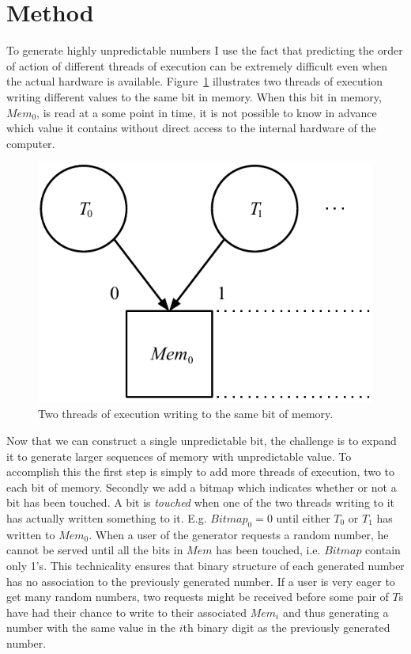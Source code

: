 \section{Method}
\label{sec:method}
To generate highly unpredictable numbers I use the fact that predicting the order of action of different threads of execution can be extremely difficult even when the actual hardware is available.
Figure~\ref{fig:TrueRand} illustrates two threads of execution writing different values to the same bit in memory.
When this bit in memory, $Mem_0$, is read at a some point in time, it is not possible to know in advance which value it contains without direct access to the internal hardware of the computer.

\begin{figure}
	\centering
		\includegraphics[width=0.5\columnwidth]{image/TrueRand.pdf}
	\caption{Two threads of execution writing to the same bit of memory.}
	\label{fig:TrueRand}
\end{figure}

Now that we can construct a single unpredictable bit, the challenge is to expand it to generate larger sequences of memory with unpredictable value.
To accomplish this the first step is simply to add more threads of execution, two to each bit of memory.
Secondly we add a bitmap which indicates whether or not a bit has been touched.
A bit is \emph{touched} when one of the two threads writing to it has actually written something to it.
E.g. $Bitmap_0=0$ until either $T_0$ or $T_1$ has written to $Mem_0$.
When a user of the generator requests a random number, he cannot be served until all the bits in $Mem$ has been touched, i.e. $Bitmap$ contain only 1's.
This technicality ensures that binary structure of each generated number has no association to the previously generated number.
If a user is very eager to get many random numbers, two requests might be received before some pair of $T$s have had their chance to write to their associated $Mem_i$ and thus generating a number with the same value in the $i$th binary digit as the previously generated number.

